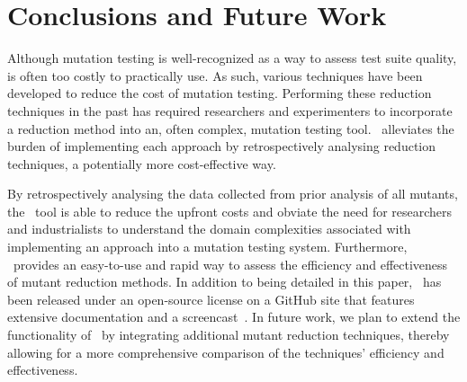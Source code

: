 \section{Conclusions and Future Work}

Although mutation testing is well-recognized as a way to assess test suite
quality, is often too costly to practically use. As such, various techniques
have been developed to reduce the cost of mutation testing. Performing these
reduction techniques in the past has required researchers and experimenters to
incorporate a reduction method into an, often complex, mutation testing tool.
\mr~alleviates the burden of implementing each approach by retrospectively
analysing reduction techniques, a potentially more cost-effective way.

By retrospectively analysing the data collected from prior analysis of all
mutants, the \mr~tool is able to reduce the upfront costs and obviate the need
for researchers and industrialists to understand the domain complexities
associated with implementing an approach into a mutation testing system.
Furthermore, \mr~provides an easy-to-use and rapid way to assess the efficiency
and effectiveness of mutant reduction methods. In addition to being detailed in
this paper, \mr~has been released under an open-source license on a GitHub site
that features extensive documentation and a screencast~\cite{tool}. In future
work, we plan to extend the functionality of \mr~by integrating additional
mutant reduction techniques, thereby allowing for a more comprehensive
comparison of the techniques' efficiency and effectiveness.

